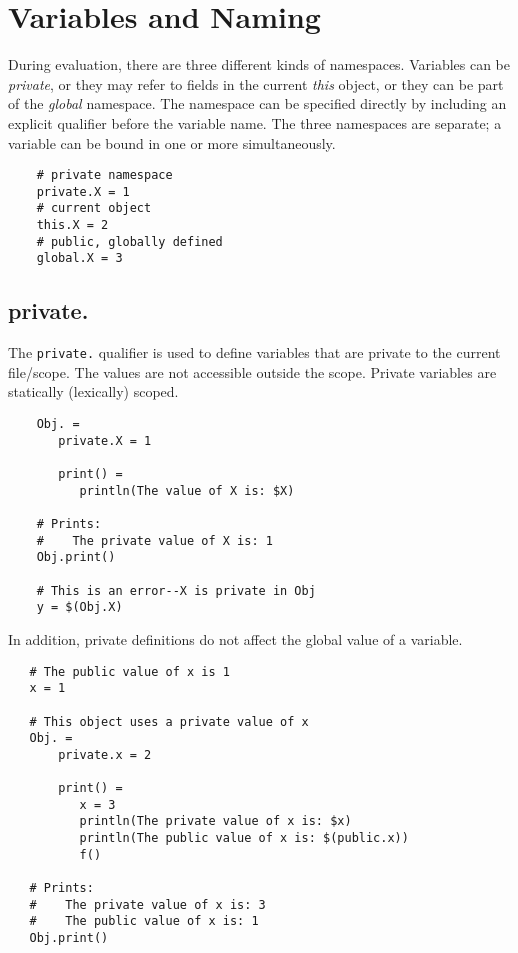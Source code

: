 %
\chapter{Variables and Naming}
\label{chapter:naming}

During evaluation, there are three different kinds of namespaces.  Variables can be \emph{private},
or they may refer to fields in the current \emph{this} object, or they can be part of the
\emph{global} namespace.  The namespace can be specified directly by including an explicit qualifier
before the variable name.  The three namespaces are separate; a variable can be bound in one or more
simultaneously.

\begin{verbatim}
    # private namespace
    private.X = 1
    # current object
    this.X = 2
    # public, globally defined
    global.X = 3
\end{verbatim}

\section{private.}
\label{section:private}

The \verb+private.+ qualifier is used to define variables that are private to the current file/scope.
The values are not accessible outside the scope.  Private variables are statically (lexically) scoped.

\begin{verbatim}
    Obj. =
       private.X = 1

       print() =
          println(The value of X is: $X)

    # Prints:
    #    The private value of X is: 1
    Obj.print()

    # This is an error--X is private in Obj
    y = $(Obj.X)
\end{verbatim}

In addition, private definitions do not affect the global value of a variable.

\begin{verbatim}
   # The public value of x is 1
   x = 1

   # This object uses a private value of x
   Obj. =
       private.x = 2

       print() =
          x = 3
          println(The private value of x is: $x)
          println(The public value of x is: $(public.x))
          f()

   # Prints:
   #    The private value of x is: 3
   #    The public value of x is: 1
   Obj.print()
\end{verbatim}

